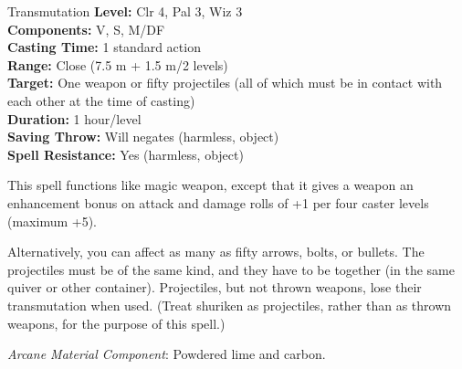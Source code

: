 {Transmutation}
{
	\textbf{Level:}
	Clr 4, Pal 3, Wiz 3\\
	\textbf{Components:}
	V, S, M/DF\\
	\textbf{Casting Time:}
	1 standard action\\
	\textbf{Range:}
	Close (7.5 m + 1.5 m/2 levels)\\
	\textbf{Target:}
	One weapon or fifty projectiles (all of which must be in contact with each other at the time of casting)\\
	\textbf{Duration:}
	1 hour/level\\
	\textbf{Saving Throw:}
	Will negates (harmless, object)\\
	\textbf{Spell Resistance:}
	Yes (harmless, object)\\
}
{
	This spell functions like magic weapon, except that it gives a weapon an enhancement bonus on attack and damage rolls of +1 per four caster levels (maximum +5).

	Alternatively, you can affect as many as fifty arrows, bolts, or bullets. The projectiles must be of the same kind, and they have to be together (in the same quiver or other container). Projectiles, but not thrown weapons, lose their transmutation when used. (Treat shuriken as projectiles, rather than as thrown weapons, for the purpose of this spell.)

	\textit{Arcane Material Component}:
	Powdered lime and carbon.

}
